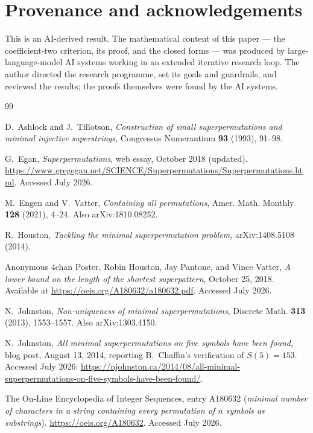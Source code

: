 \documentclass[11pt]{article}
\begin{document}
\section*{Provenance and acknowledgements}

This is an AI-derived result.  The mathematical content of this paper --- the
coefficient-two criterion, its proof, and the closed forms --- was produced by
large-language-model AI systems working in an extended iterative research loop.  The author
directed the research programme, set its goals and guardrails, and reviewed the results; the
proofs themselves were found by the AI systems.

\begin{thebibliography}{99}

D.~Ashlock and J.~Tillotson,
\emph{Construction of small superpermutations and minimal injective superstrings},
Congressus Numerantium \textbf{93} (1993), 91--98.

G.~Egan,
\emph{Superpermutations},
web essay, October 2018 (updated).
\url{https://www.gregegan.net/SCIENCE/Superpermutations/Superpermutations.html}.
Accessed July 2026.

M.~Engen and V.~Vatter,
\emph{Containing all permutations},
Amer. Math. Monthly \textbf{128} (2021), 4--24.
Also arXiv:1810.08252.

R.~Houston,
\emph{Tackling the minimal superpermutation problem},
arXiv:1408.5108 (2014).

Anonymous 4chan Poster, Robin Houston, Jay Pantone, and Vince Vatter,
\emph{A lower bound on the length of the shortest superpattern}, October 25, 2018.
Available at \url{https://oeis.org/A180632/a180632.pdf}.
Accessed July 2026.

N.~Johnston,
\emph{Non-uniqueness of minimal superpermutations},
Discrete Math. \textbf{313} (2013), 1553--1557.
Also arXiv:1303.4150.

N.~Johnston,
\emph{All minimal superpermutations on five symbols have been found},
blog post, August 13, 2014, reporting B.~Chaffin's verification of \(S(5)=153\).
Accessed July 2026:
\url{https://njohnston.ca/2014/08/all-minimal-superpermutations-on-five-symbols-have-been-found/}.

The On-Line Encyclopedia of Integer Sequences,
entry A180632 (\emph{minimal number of characters in a string containing every permutation of
\(n\) symbols as substrings}).
\url{https://oeis.org/A180632}.
Accessed July 2026.

\end{thebibliography}
\end{document}
